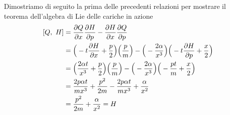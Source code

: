     Dimostriamo di seguito la prima delle precedenti relazioni per mostrare il teorema dell'algebra di Lie delle cariche in azione
    \begin{equation*}
    \begin{aligned}
    \poi{Q}{H} & = \pdv{Q}{x}\pdv{H}{p}-\pdv{H}{x}\pdv{Q}{p} \\ & = \Big (-t \pdv{H}{x}+ \frac{p}{2} \Big) \Big( \frac{p}{m} \Big) -  \Big (- \frac{2 \alpha}{x^3} \Big) \Big (-t \pdv{H}{p}+ \frac{x}{2} \Big) \\ & = \Big ( \frac{2 \alpha t}{x^3} + \frac{p}{2} \Big) \Big( \frac{p}{m} \Big) - \Big (- \frac{2 \alpha}{x^3} \Big) \Big (- \frac{pt}{m} + \frac{x}{2} \Big) \\ & = \frac{2 p \alpha t}{m x^3} + \frac{p^2}{2m} - \frac{2 p \alpha t}{m x^3} + \frac{\alpha}{x^2} \\ & = \frac{p^2}{2m} + \frac{\alpha}{x^2} = H
    \end{aligned}
    \end{equation*}
